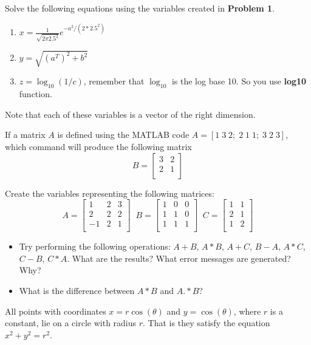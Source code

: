 \documentclass[12pt]{TDTP}
\begin{document}
\Exo
Solve the following equations using the variables created in \textbf{Problem 1}.
\begin{enumerate}
\item $x = \frac{1}{\sqrt{2\pi 2.5^2}} e^{-a^2/(2*2.5^2)}$
\item $y = \sqrt{(a^T)^2 + b^2}$
\item $z = \log_{10}(1/c) $, remember that $\log_{10}$ is the log base 10. So you use \textbf{log10} function. 
\end{enumerate}
Note that each of these variables is a vector of the right dimension.

\Exo
If a matrix $A$ is defined using the MATLAB code $A=[1\; 3\; 2; \; 2\;1\;1; \; 3\; 2\; 3]$, which command will produce the following matrix
$$
B=\begin{bmatrix}
3&2\\
2&1\\
\end{bmatrix}
$$ 

\Exo
Create the variables representing the following matrices:
$$
A=\begin{bmatrix}
1&2&3\\
2&2&2\\
-1&2&1\\
\end{bmatrix} \;\;
B=\begin{bmatrix}
1&0&0\\
1&1&0\\
1&1&1\\
\end{bmatrix} \;\;
C=\begin{bmatrix}
1&1\\
2&1\\
1&2\\
\end{bmatrix}
$$
\begin{itemize}
\item Try performing the following operations: $A+B$, $A*B$, $A+C$, $B-A$, $A*C$, $C-B$, $C*A$.
What are the results? What error messages are generated? Why?

\item What is the difference between $A*B$ and $A.*B$?
\end{itemize}

\Exo
All points with coordinates $x=r\cos(\theta)$ and $y=\cos(\theta)$, where $r$ is a constant, lie on a circle with radius $r$. That is they satisfy the equation $x^2+y^2=r^2$.
\end{document}
